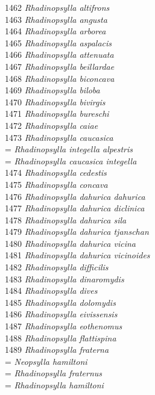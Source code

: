\documentclass[
]{article}
\begin{document}
1462 \emph{Rhadinopsylla altifrons}\\
1463 \emph{Rhadinopsylla angusta}\\
1464 \emph{Rhadinopsylla arborea}\\
1465 \emph{Rhadinopsylla aspalacis}\\
1466 \emph{Rhadinopsylla attenuata}\\
1467 \emph{Rhadinopsylla beillardae}\\
1468 \emph{Rhadinopsylla biconcava}\\
1469 \emph{Rhadinopsylla biloba}\\
1470 \emph{Rhadinopsylla bivirgis}\\
1471 \emph{Rhadinopsylla bureschi}\\
1472 \emph{Rhadinopsylla caiae}\\
1473 \emph{Rhadinopsylla caucasica}\\
= \emph{Rhadinopsylla integella alpestris}\\
= \emph{Rhadinopsylla caucasica integella}\\
1474 \emph{Rhadinopsylla cedestis}\\
1475 \emph{Rhadinopsylla concava}\\
1476 \emph{Rhadinopsylla dahurica dahurica}\\
1477 \emph{Rhadinopsylla dahurica diclinica}\\
1478 \emph{Rhadinopsylla dahurica sila}\\
1479 \emph{Rhadinopsylla dahurica tjanschan}\\
1480 \emph{Rhadinopsylla dahurica vicina}\\
1481 \emph{Rhadinopsylla dahurica vicinoides}\\
1482 \emph{Rhadinopsylla difficilis}\\
1483 \emph{Rhadinopsylla dinaromydis}\\
1484 \emph{Rhadinopsylla dives}\\
1485 \emph{Rhadinopsylla dolomydis}\\
1486 \emph{Rhadinopsylla eivissensis}\\
1487 \emph{Rhadinopsylla eothenomus}\\
1488 \emph{Rhadinopsylla flattispina}\\
1489 \emph{Rhadinopsylla fraterna}\\
= \emph{Neopsylla hamiltoni}\\
= \emph{Rhadinopsylla fraternus}\\
= \emph{Rhadinopsylla hamiltoni}\\
\end{document}
